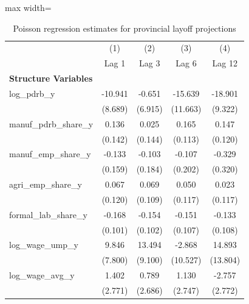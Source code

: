 \begin{table}[H]\centering
\caption{Poisson regression estimates for provincial layoff projections}
\small
\renewcommand{\arraystretch}{1.15}
\begin{adjustbox}{max width=\textwidth}
\begin{tabular}{l*{4}{c}}
\toprule
& (1) & (2) & (3) & (4) \\ & Lag 1 & Lag 3 & Lag 6 & Lag 12 \\ \midrule
\addlinespace\textbf{Structure Variables}&                     &                     &                     &                     \\
log\_pdrb\_y  &     -10.941         &      -0.651         &     -15.639         &     -18.901\sym{*}  \\
            &     (8.689)         &     (6.915)         &    (11.663)         &     (9.322)         \\
manuf\_pdrb\_share\_y&       0.136         &       0.025         &       0.165         &       0.147         \\
            &     (0.142)         &     (0.144)         &     (0.113)         &     (0.120)         \\
manuf\_emp\_share\_y&      -0.133         &      -0.103         &      -0.107         &      -0.329         \\
            &     (0.159)         &     (0.184)         &     (0.202)         &     (0.320)         \\
agri\_emp\_share\_y&       0.067         &       0.069         &       0.050         &       0.023         \\
            &     (0.120)         &     (0.109)         &     (0.117)         &     (0.117)         \\
formal\_lab\_share\_y&      -0.168         &      -0.154         &      -0.151         &      -0.133         \\
            &     (0.101)         &     (0.102)         &     (0.107)         &     (0.108)         \\
log\_wage\_ump\_y&       9.846         &      13.494         &      -2.868         &      14.893         \\
            &     (7.800)         &     (9.100)         &    (10.527)         &    (13.804)         \\
log\_wage\_avg\_y&       1.402         &       0.789         &       1.130         &      -2.757         \\
            &     (2.771)         &     (2.686)         &     (2.747)         &     (2.772)         \\

\end{tabular}
\end{adjustbox}
\end{table}
